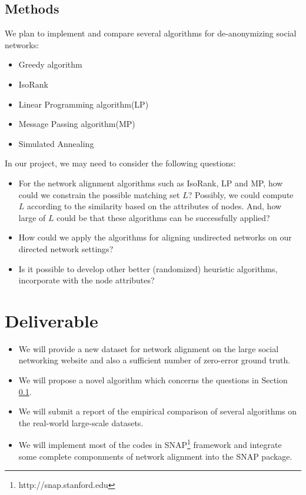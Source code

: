 \documentclass[11pt,letterpaper]{article}
\begin{document}
\subsection{Methods}
\label{methodsection}
We plan to implement and compare several algorithms for de-anonymizing social networks:
\begin{itemize}
	\item
		Greedy algorithm  \cite{Narayanan2009}
	\item
		IsoRank \cite{Singh2007}
	\item 
		Linear Programming algorithm(LP) \cite{Klau2009}
	\item
		Message Passing algorithm(MP) \cite{Bayati2009a,Pache2012}
	\item
		Simulated Annealing \cite{Kreitmann2011}
\end{itemize}
In our project, we may need to consider the following questions:
\begin{itemize}
	\item
		For the network alignment algorithms such as IsoRank, LP and MP, how could we constrain the possible matching set $L$? Possibly, we could compute $L$ according to the similarity based on the attributes of nodes. And, how large of $L$ could be that these algorithms can be successfully applied?
	\item
		How could we apply the algorithms for aligning undirected networks on our directed network settings?
	\item
		Is it possible to develop other better (randomized) heuristic algorithms, incorporate with the node attributes?
\end{itemize}

\section{Deliverable}
\begin{itemize}
\item
We will provide a new dataset for network alignment on the large social networking website and also a sufficient number of zero-error ground truth. 

\item We will propose a novel algorithm which concerns the questions in Section \ref{methodsection}.

\item
We will submit a report of the empirical comparison of several algorithms on the real-world large-scale datasets. 

\item
We will implement most of the codes in SNAP\footnote{http://snap.stanford.edu} framework and integrate some complete componments of network alignment into the SNAP package.  
\end{itemize}
{
\small


}
\end{document}
